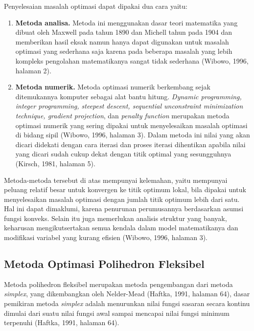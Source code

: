Penyelesaian masalah optimasi dapat dipakai dua cara yaitu:
\begin{enumerate}[label=\arabic*.]
\item \textbf{Metoda analisa.} Metoda ini menggunakan dasar teori
      matematika yang dibuat oleh Maxwell pada tahun 1890 dan Michell
      tahun pada 1904 dan memberikan hasil eksak namun hanya dapat
      digunakan untuk masalah optimasi yang sederhana saja karena pada
      beberapa masalah yang lebih kompleks pengolahan matematikanya
      sangat tidak sederhana (Wibowo, 1996, halaman 2).
\item \textbf{Metoda numerik.} Metoda optimasi numerik berkembang sejak
      ditemukannya komputer sebagai alat bantu hitung. \textit{Dynamic
      programming, integer programming, steepest descent, sequential
      unconstraint minimization technique, gradient projection}, dan
      \textit{penalty function} merupakan metoda optimasi numerik yang
      sering dipakai untuk menyelesaikan masalah optimasi di bidang
      sipil (Wibowo, 1996, halaman 3). Dalam metoda ini nilai yang akan
      dicari didekati dengan cara iterasi dan proses iterasi dihentikan
      apabila nilai yang dicari sudah cukup dekat dengan titik optimal
      yang sesungguhnya (Kirsch, 1981, halaman 5).
\end{enumerate}

Metoda-metoda tersebut di atas mempunyai kelemahan, yaitu mempunyai
peluang relatif besar untuk konvergen ke titik optimum lokal, bila
dipakai untuk menyelesaikan masalah optimasi dengan jumlah titik optimum
lebih dari satu. Hal ini dapat dimaklumi, karena penurunan perumusannya
berdasarkan asumsi fungsi konveks. Selain itu juga memerlukan analisis
struktur yang banyak, keharusan mengikutsertakan semua kendala dalam
model matematikanya dan modifikasi variabel yang kurang efisien (Wibowo,
1996, halaman 3).

\subsection{Metoda Optimasi Polihedron Fleksibel}
\label{sec:polihedron}

Metoda polihedron fleksibel merupakan metoda pengembangan dari metoda
\textit{simplex}, yang dikembangkan oleh Nelder-Mead (Haftka, 1991,
halaman 64), dasar pemikiran metoda \textit{simplex} adalah menurunkan
nilai fungsi sasaran secara kontinu dimulai dari suatu nilai fungsi awal
sampai mencapai nilai fungsi minimum terpenuhi (Haftka, 1991, halaman
64).

